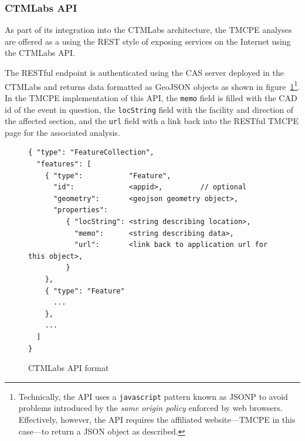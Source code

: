 \documentclass[12pt]{report}
\newcounter{space}
\begin{document}


\subsubsection{CTMLabs API}
\label{sec:ctmlabs-api}

As part of its integration into the \ac{CTMLabs} architecture, the
\ac{TMCPE} analyses are offered as a using the \ac{REST} style of
exposing services on the Internet
\citep{fielding00:_archit_styles_desig_networ_softw_archit} using the
CTMLabs \ac{API}.

The RESTful endpoint is authenticated using the \ac{CAS} server
deployed in the \ac{CTMLabs} and returns data formatted as
\ac{GeoJSON} objects \citep{butler08:_geojs_format_specif} as shown in
figure~\ref{fig:ctmlabs-api}\footnote{Technically, the \ac{API} uses a
  \texttt{javascript} pattern known as \ac{JSONP}
  \citep{özses09:_cross_jsonp_part} to avoid problems introduced by
  the \emph{same origin policy} enforced by web browsers.
  Effectively, however, the \ac{API} requires the affiliated
  website---\ac{TMCPE} in this case---to return a JSON object as
  described.}.  In the \ac{TMCPE} implementation of this \ac{API}, the
\texttt{memo} field is filled with the CAD id of the event in
question, the \texttt{locString} field with the facility and direction
of the affected section, and the \texttt{url} field with a link back
into the RESTful \ac{TMCPE} page for the associated analysis.
\begin{figure}[t]
  \centering
\begin{singlespace}
\begin{verbatim}
{ "type": "FeatureCollection",
  "features": [
    { "type":           "Feature",
      "id":             <appid>,         // optional
      "geometry":       <geojson geometry object>,
      "properties":    
         { "locString": <string describing location>,
           "memo":      <string describing data>,
           "url":       <link back to application url for this object>,
         }
    },
    { "type": "Feature"
      ...
    },
    ...
  ]
}
\end{verbatim}
\end{singlespace}
\caption{CTMLabs API format}
  \label{fig:ctmlabs-api}
\end{figure}
\end{document}
